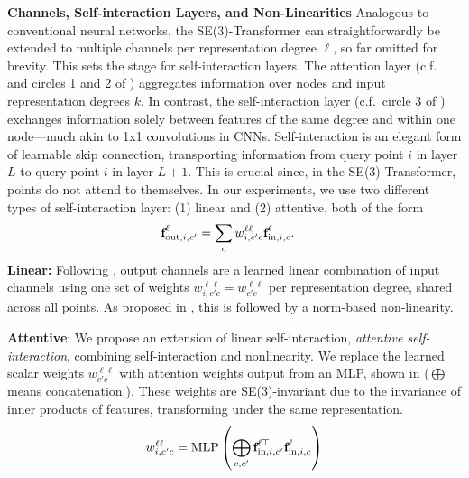 \documentclass{article}
\begin{document}
\textbf{Channels, Self-interaction Layers, and Non-Linearities}
Analogous to conventional neural networks, the SE(3)-Transformer can straightforwardly be extended to multiple channels per representation degree $\ell$, so far omitted for brevity. This sets the stage for self-interaction layers. The attention layer (c.f.\  and circles 1 and 2 of ) aggregates information over nodes and input representation degrees $k$. In contrast, the self-interaction layer (c.f.\ circle 3 of ) exchanges information solely between features of the same degree and within one node---much akin to 1x1 convolutions in CNNs. Self-interaction is an elegant form of learnable skip connection, transporting information from query point $i$ in layer $L$ to query point $i$ in layer $L+1$. This is crucial since, in the SE(3)-Transformer, points do not attend to themselves. In our experiments, we use two different types of self-interaction layer: (1) linear and (2) attentive, both of the form
\begin{align}
    \textbf{f}_{\text{out},i,c'}^\ell &= \sum_{c} w_{i,c'c}^{\ell\ell} \textbf{f}_{\text{in},i,c}^\ell \label{eq:self-interaction}.
\end{align}
\textbf{Linear:} Following \citet{schnet}, output channels are a learned linear combination of input channels using one set of weights $w_{i,c'c}^{\ell\ell} = w_{c'c}^{\ell\ell}$ per representation degree, shared across all points. As proposed in \citet{ThomasSKYKR18}, this is followed by a norm-based non-linearity. 

\textbf{Attentive}: We propose an extension of linear self-interaction, \emph{attentive self-interaction}, combining self-interaction and nonlinearity. We replace the learned scalar weights $w_{c'c}^{\ell\ell}$ with attention weights output from an MLP, shown in  ($\bigoplus$ means concatenation.). These weights are SE(3)-invariant due to the invariance of inner products of features, transforming under the same representation.
\begin{align}
w_{i,c'c}^{\ell\ell} = \text{MLP}\left( \bigoplus_{c,c'}\textbf{f}_{\text{in},i,c'}^{\ell\top}\textbf{f}_{\text{in},i,c}^\ell \right)
\label{eq:attentive-self-interaction}
\end{align}
\end{document}

